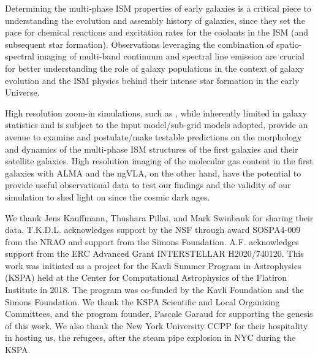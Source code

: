 \IfFileExists{emulateapjlegacy.cls}{\documentclass[iop]{emulateapjlegacy}}{\documentclass[iop]{emulateapj}}
\begin{document}
Determining the multi-phase ISM properties of early galaxies
is a critical piece to understanding the evolution and
assembly history of galaxies, since they set the pace
for chemical reactions and excitation rates for the coolants in the ISM (and subsequent star formation).
Observations leveraging the combination of spatio-spectral imaging of
multi-band continuum and spectral line emission are crucial for better understanding
the role of \highz galaxy populations
in the context of galaxy evolution and the ISM physics behind their intense star formation in the early Universe.

High resolution zoom-in simulations, such as , while inherently limited in galaxy
statistics and is subject to the input model/sub-grid models adopted, 
provide an avenue to examine and postulate/make testable predictions on the morphology and dynamics of
the multi-phase ISM structures of the first galaxies and their satellite galaxies.
High resolution imaging of the molecular gas content in the first galaxies with ALMA and the ngVLA, on the other hand,
have the potential to provide useful observational data to test our findings and the validity of our simulation to shed
light on \SF since the cosmic dark ages.



\acknowledgements

We thank Jens Kauffmann, Thushara Pillai, and Mark Swinbank for sharing their data.
T.K.D.L. acknowledges support by the NSF through award SOSPA4-009
from the NRAO and support from the Simons Foundation.
A.F. acknowledges support from the ERC Advanced Grant INTERSTELLAR H2020/740120.
This work was initiated as a project for the Kavli Summer Program in Astrophysics (KSPA)
held at the Center for
Computational Astrophysics of the Flatiron Institute in 2018. The program was co-funded by the Kavli
Foundation and the Simons Foundation.
We thank the KSPA Scientific and Local Organizing Committees, and the program founder,
Pascale Garaud for supporting the genesis of this work.
We also thank the New York University CCPP for their hospitality in hosting us, the refugees, after the steam pipe explosion in NYC during the KSPA.
\end{document}
